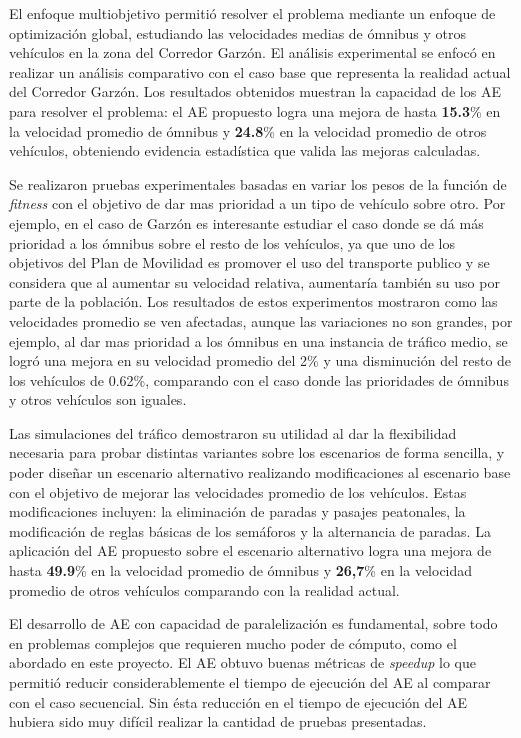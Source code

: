 El enfoque multiobjetivo permitió resolver el problema mediante un enfoque de optimización global, estudiando las velocidades medias de ómnibus y otros vehículos en la zona del Corredor Garzón. El análisis experimental se enfocó en realizar un análisis comparativo con el caso base que representa la realidad actual del Corredor Garzón. Los resultados obtenidos muestran la capacidad de los AE para resolver el problema: el AE propuesto logra una mejora de hasta \textbf{15.3}\% en la velocidad promedio de ómnibus y \textbf{24.8}\% en la velocidad promedio de otros vehículos, obteniendo evidencia estadística que valida las mejoras calculadas.

Se realizaron pruebas experimentales basadas en variar los pesos de la función de \emph{fitness} con el objetivo de dar mas prioridad a un tipo de vehículo sobre otro. Por ejemplo, en el caso de Garzón es interesante estudiar el caso donde se dá más prioridad a los ómnibus sobre el resto de los vehículos, ya que uno de los objetivos del Plan de Movilidad es promover el uso del transporte publico y se considera que al aumentar su velocidad relativa, aumentaría también su uso por parte de la población. Los resultados de estos experimentos mostraron como las velocidades promedio se ven afectadas, aunque las variaciones no son grandes, por ejemplo, al dar mas prioridad a los ómnibus en una instancia de tráfico medio, se logró una mejora en su velocidad promedio del 2\% y una disminución del resto de los vehículos de 0.62\%, comparando con el caso donde las prioridades de ómnibus y otros vehículos son iguales.

Las simulaciones del tráfico demostraron su utilidad al dar la flexibilidad necesaria para probar distintas variantes sobre los escenarios de forma sencilla, y poder diseñar un escenario alternativo realizando modificaciones al escenario base con el objetivo de mejorar las velocidades promedio de los vehículos. Estas modificaciones incluyen: la eliminación de paradas y pasajes peatonales, la modificación de reglas básicas de los semáforos y la alternancia de paradas. La aplicación del AE propuesto sobre el escenario alternativo logra una mejora de hasta \textbf{49.9}\% en la velocidad promedio de ómnibus y \textbf{26,7}\% en la velocidad promedio de otros vehículos comparando con la realidad actual.

El desarrollo de AE con capacidad de paralelización es fundamental, sobre todo en problemas complejos que requieren mucho poder de cómputo, como el abordado en este proyecto. El AE obtuvo buenas métricas de \emph{speedup} lo que permitió reducir considerablemente el tiempo de ejecución del AE al comparar con el caso secuencial. Sin ésta reducción en el tiempo de ejecución del AE hubiera sido muy difícil realizar la cantidad de pruebas presentadas.

